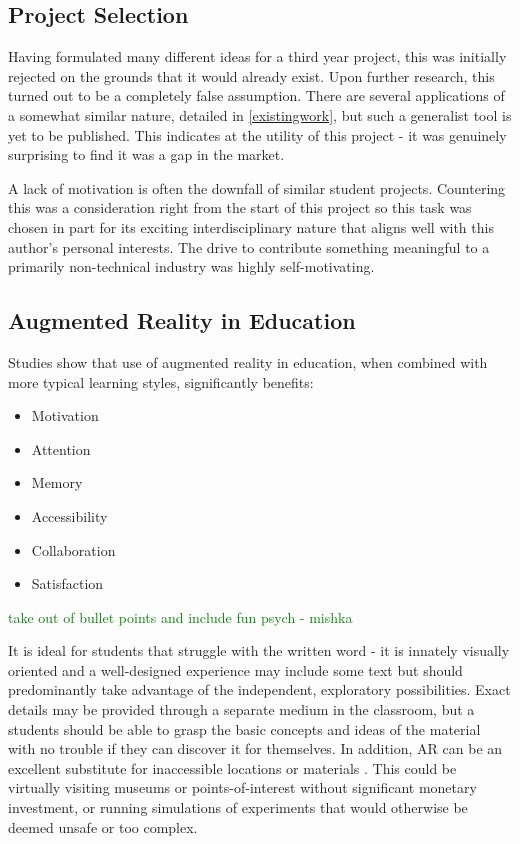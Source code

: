 \documentclass{article}
\newcommand{\could}[1]{\textcolor{green}{#1}}
\begin{document}
\subsection{Project Selection}
Having formulated many different ideas for a third year project, this was initially rejected on the grounds that it would already exist. Upon further research, this turned out to be a completely false assumption. There are several applications of a somewhat similar nature, detailed in \ref{existingwork}, but such a generalist tool is yet to be published. This indicates at the utility of this project - it was genuinely surprising to find it was a gap in the market.

A lack of motivation is often the downfall of similar student projects. Countering this was a consideration right from the start of this project so this task was chosen in part for its exciting interdisciplinary nature that aligns well with this author's personal interests. The drive to contribute something meaningful to a primarily non-technical industry was highly self-motivating.

\subsection{Augmented Reality in Education}
Studies show that use of augmented reality in education, when combined with more typical learning styles, significantly benefits: \cite{education:ARlit}

\begin{itemize}
    \item Motivation
    \item Attention
    \item Memory
    \item Accessibility
    \item Collaboration
    \item Satisfaction
\end{itemize}

\could{take out of bullet points and include fun psych - mishka}

It is ideal for students that struggle with the written word \cite{education:class} - it is innately visually oriented and a well-designed experience may include some text but should predominantly take advantage of the independent, exploratory possibilities. Exact details may be provided through a separate medium in the classroom, but a students should be able to grasp the basic concepts and ideas of the material with no trouble if they can discover it for themselves. In addition, AR can be an excellent substitute for inaccessible locations or materials \cite{education:placespotentials}. This could be virtually visiting museums or points-of-interest without significant monetary investment, or running simulations of experiments that would otherwise be deemed unsafe or too complex.
\end{document}
